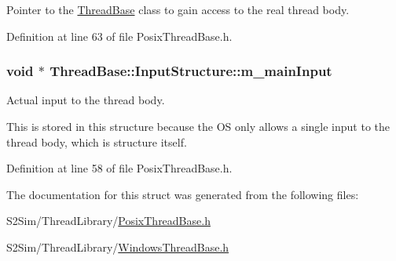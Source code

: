 Pointer to the \hyperlink{class_thread_base}{Thread\-Base} class to gain access to the real thread body. 



Definition at line 63 of file Posix\-Thread\-Base.\-h.

\hypertarget{struct_thread_base_1_1_input_structure_ab91961eacdcce8b1628f46a1a116fa1e}{
\subsubsection[{m\-\_\-main\-Input}]{\setlength{\rightskip}{0pt plus 5cm}void $\ast$ Thread\-Base\-::\-Input\-Structure\-::m\-\_\-main\-Input}}\label{struct_thread_base_1_1_input_structure_ab91961eacdcce8b1628f46a1a116fa1e}


Actual input to the thread body. 

This is stored in this structure because the O\-S only allows a single input to the thread body, which is structure itself. 

Definition at line 58 of file Posix\-Thread\-Base.\-h.



The documentation for this struct was generated from the following files\-:\begin{DoxyCompactItemize}
\item 
S2\-Sim/\-Thread\-Library/\hyperlink{_posix_thread_base_8h}{Posix\-Thread\-Base.\-h}\item 
S2\-Sim/\-Thread\-Library/\hyperlink{_windows_thread_base_8h}{Windows\-Thread\-Base.\-h}\end{DoxyCompactItemize}
